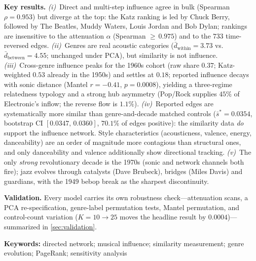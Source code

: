 \documentclass[11pt,letterpaper]{article}
\numberwithin{equation}{section}
\begin{document}
\noindent\textbf{Key results.}
\emph{(i)}~Direct and multi-step influence agree in bulk (Spearman
$\rho=0.953$) but diverge at the top: the Katz ranking is led by Chuck
Berry, followed by The Beatles, Muddy Waters, Louis Jordan and Bob Dylan;
rankings are insensitive to the attenuation $\alpha$ (Spearman
${\ge}\,0.975$) and to the $733$ time-reversed edges.
\emph{(ii)}~Genres are real acoustic categories
($\bar d_{\mathrm{within}}=3.73$ vs.\ $\bar d_{\mathrm{between}}=4.55$;
unchanged under PCA), but similarity is not influence.
\emph{(iii)}~Cross-genre influence peaks for the 1960s cohort (raw share
$0.37$; Katz-weighted $0.53$ already in the 1950s) and settles at $0.18$;
reported influence decays with sonic distance (Mantel $r=-0.41$,
$p=0.0008$), yielding a three-regime relatedness typology and a strong
hub asymmetry (Pop/Rock supplies $45\%$ of Electronic's inflow; the
reverse flow is $1.1\%$).
\emph{(iv)}~Reported edges are systematically more similar than
genre-and-decade matched controls ($\bar s^{*}=0.0354$, bootstrap CI
$[0.0347,\,0.0360]$, $70.1\%$ of edges positive): the similarity data
\emph{do} support the influence network. Style characteristics
(acousticness, valence, energy, danceability) are an order of magnitude
more contagious than structural ones, and only danceability and valence
additionally show directional tracking.
\emph{(v)}~The only \emph{strong} revolutionary decade is the 1970s
(sonic and network channels both fire); jazz evolves through catalysts
(Dave Brubeck), bridges (Miles Davis) and guardians, with the 1949 bebop
break as the sharpest discontinuity.

\noindent\textbf{Validation.} Every model carries its own robustness
check---attenuation scans, a PCA re-specification, genre-label permutation
tests, Mantel permutation, and control-count variation
($K=10\to25$ moves the headline result by $0.0004$)---summarized in
\cref{sec:validation}.

\medskip
\noindent\textbf{Keywords:} directed network; musical influence; similarity
measurement; genre evolution; PageRank; sensitivity analysis
\newpage

\tableofcontents
\newpage

\end{document}
